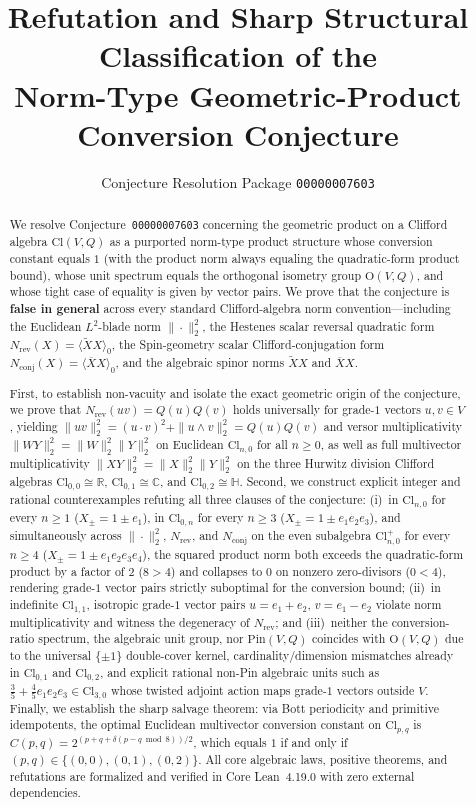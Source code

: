 \documentclass[11pt]{article}
\title{\textbf{Refutation and Sharp Structural Classification of the\\Norm-Type Geometric-Product Conversion Conjecture}}
\author{Conjecture Resolution Package \texttt{00000007603}}
\date{}
\theoremstyle{definition}
\newcommand{\Cl}{\mathrm{Cl}}
\newcommand{\Pin}{\mathrm{Pin}}
\newcommand{\Orth}{\mathrm{O}}
\newcommand{\R}{\mathbb{R}}
\newcommand{\C}{\mathbb{C}}
\newcommand{\HH}{\mathbb{H}}
\newcommand{\Nrev}{N_{\mathrm{rev}}}
\newcommand{\Nconj}{N_{\mathrm{conj}}}
\begin{document}
\maketitle

\begin{abstract}
We resolve Conjecture~\texttt{00000007603} concerning the geometric product on a Clifford algebra $\Cl(V,Q)$ as a purported norm-type product structure whose conversion constant equals $1$ (with the product norm always equaling the quadratic-form product bound), whose unit spectrum equals the orthogonal isometry group $\Orth(V,Q)$, and whose tight case of equality is given by vector pairs. We prove that the conjecture is \textbf{false in general} across every standard Clifford-algebra norm convention---including the Euclidean $L^2$-blade norm $\|\cdot\|_2^2$, the Hestenes scalar reversal quadratic form $\Nrev(X)=\langle\widetilde{X}X\rangle_0$, the Spin-geometry scalar Clifford-conjugation form $\Nconj(X)=\langle\overline{X}X\rangle_0$, and the algebraic spinor norms $\widetilde{X}X$ and $\overline{X}X$.

First, to establish non-vacuity and isolate the exact geometric origin of the conjecture, we prove that $\Nrev(uv)=Q(u)Q(v)$ holds universally for grade-$1$ vectors $u,v\in V$, yielding $\|uv\|_2^2=(u\cdot v)^2+\|u\wedge v\|_2^2=Q(u)Q(v)$ and versor multiplicativity $\|WY\|_2^2=\|W\|_2^2\|Y\|_2^2$ on Euclidean $\Cl_{n,0}$ for all $n\ge 0$, as well as full multivector multiplicativity $\|XY\|_2^2=\|X\|_2^2\|Y\|_2^2$ on the three Hurwitz division Clifford algebras $\Cl_{0,0}\cong\R$, $\Cl_{0,1}\cong\C$, and $\Cl_{0,2}\cong\HH$. Second, we construct explicit integer and rational counterexamples refuting all three clauses of the conjecture: (i)~in $\Cl_{n,0}$ for every $n\ge 1$ ($X_\pm=1\pm e_1$), in $\Cl_{0,n}$ for every $n\ge 3$ ($X_\pm=1\pm e_1e_2e_3$), and simultaneously across $\|\cdot\|_2^2$, $\Nrev$, and $\Nconj$ on the even subalgebra $\Cl_{n,0}^+$ for every $n\ge 4$ ($X_\pm=1\pm e_1e_2e_3e_4$), the squared product norm both exceeds the quadratic-form product by a factor of $2$ ($8>4$) and collapses to $0$ on nonzero zero-divisors ($0<4$), rendering grade-$1$ vector pairs strictly suboptimal for the conversion bound; (ii)~in indefinite $\Cl_{1,1}$, isotropic grade-$1$ vector pairs $u=e_1+e_2$, $v=e_1-e_2$ violate norm multiplicativity and witness the degeneracy of $\Nrev$; and (iii)~neither the conversion-ratio spectrum, the algebraic unit group, nor $\Pin(V,Q)$ coincides with $\Orth(V,Q)$ due to the universal $\{\pm 1\}$ double-cover kernel, cardinality/dimension mismatches already in $\Cl_{0,1}$ and $\Cl_{0,2}$, and explicit rational non-Pin algebraic units such as $\frac{3}{5}+\frac{4}{5}e_1e_2e_3\in\Cl_{3,0}$ whose twisted adjoint action maps grade-$1$ vectors outside $V$. Finally, we establish the sharp salvage theorem: via Bott periodicity and primitive idempotents, the optimal Euclidean multivector conversion constant on $\Cl_{p,q}$ is $C(p,q)=2^{(p+q+\delta(p-q\bmod 8))/2}$, which equals $1$ if and only if $(p,q)\in\{(0,0),(0,1),(0,2)\}$. All core algebraic laws, positive theorems, and refutations are formalized and verified in Core Lean~4.19.0 with zero external dependencies.
\end{abstract}
\end{document}
